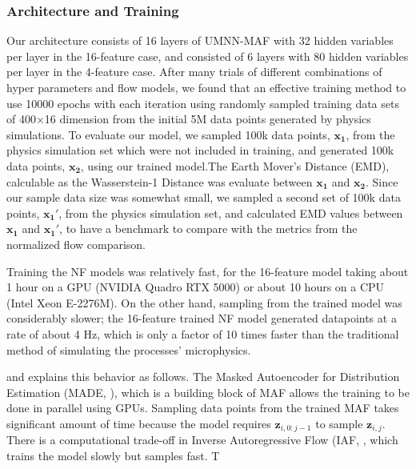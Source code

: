     \subsubsection*{Architecture and Training}
        Our architecture consists of 16 layers of UMNN-MAF with 32 hidden variables per layer in the 16-feature case, and consisted of 6 layers with 80 hidden variables per layer in the 4-feature case. After many trials of different combinations of hyper parameters and flow models, we found that an effective training method to use 10000 epochs with each iteration using randomly sampled training data sets of 400$\times$16 dimension from the initial 5M data points generated by physics simulations. To evaluate our model, we sampled 100k data points, $\mathbf{x_1}$, from the physics simulation set which were not included in training, and generated 100k data points, $\mathbf{x_2}$, using our trained model.The Earth Mover's Distance (EMD), calculable as the Wasserstein-1 Distance \parencite{Dobrushin1970PrescribingDistributions} was evaluate between $\mathbf{x_1}$ and $\mathbf{x_2}$. Since our sample data size was somewhat small, we sampled a second set of 100k data points, $\mathbf{x_1'}$, from the physics simulation set, and calculated EMD values between  $\mathbf{x_1}$ and $\mathbf{x_1'}$, to have a benchmark to compare with the metrics from the normalized flow comparison.
        
        
    
        Training the NF models was relatively fast, for the 16-feature model taking about 1 hour on a GPU (NVIDIA Quadro RTX 5000) or about 10 hours on a CPU (Intel Xeon E-2276M). On the other hand, sampling from the trained model was considerably slower; the 16-feature trained NF model generated datapoints at a rate of about 4 Hz, which is only a factor of 10 times faster than the traditional method of simulating the processes' microphysics. 
        
        \parencite{Wehenkel2019UnconstrainedNetworks} and \parencite{Papamakarios2017MaskedEstimation} explains this behavior as follows. The Masked Autoencoder for Distribution Estimation (MADE, \parencite{Germain2015MADE:Estimation}), which is a building block of MAF allows the training to be done in parallel using GPUs. Sampling data points from the trained MAF takes significant amount of time because the model requires $\mathbf{z}_{i,0:j-1}$ to sample $\mathbf{z}_{i,j}$. There is a computational trade-off in Inverse Autoregressive Flow (IAF, \parencite{Kingma2016ImprovingFlow}, which trains the model slowly but samples fast. T

